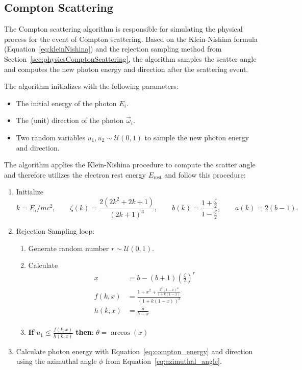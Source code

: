 \subsection{Compton Scattering}

The Compton scattering algorithm is responsible for simulating the physical process for the event of Compton scattering. Based on the Klein-Nishina formula (Equation~\ref{eq:kleinNishina}) and the rejection sampling method from Section~\ref{sec:physicsComptonScattering}, the algorithm samples the scatter angle and computes the new photon energy and direction after the scattering event.

The algorithm initializes with the following parameters:

\begin{itemize}
    \item The initial energy of the photon $E_i$.
    \item The (unit) direction of the photon $\vec{\omega}_i$.
    \item Two random variables $u_1, u_2 \sim \mathcal{U}(0, 1)$ to sample the
    new photon energy and direction.
\end{itemize}

The algorithm applies the Klein-Nishina procedure to compute the scatter angle
and therefore utilizes the electron rest energy $E_\text{rest}$ and follow this
procedure:

\begin{enumerate}[label=\arabic*.]
    \item Initialize 
    \begin{equation*}
        k = E_i/ mc^2, \qquad \zeta(k) = \frac{2(2k^2+2k+1)}{(2k + 1)^3}, \qquad b(k) = \frac{1+\frac{\zeta}{2}}{1-\frac{\zeta}{2}}, \qquad a(k) = 2(b-1).
    \end{equation*}
    \item Rejection Sampling loop:
        \begin{enumerate}[label*=\arabic*.]
            \item Generate random number $r\sim\mathcal{U}(0,1)$.
            \item Calculate 
            \begin{align*}
                x&=b-(b+1)\left(\frac{\zeta}{2}\right)^r \\
                f(k,x) &= \frac{1+x^2+\frac{k^2(1-x)^2}{1+k(1-x)}}{(1+k(1-x))^2} \\
                h(k,x) &= \frac{a}{b-x} \\
            \end{align*}
            \item \textbf{If} $u_1 \leq \frac{f(k,x)}{h(k,x)}$ \textbf{then}: $\theta = \arccos(x)$
        \end{enumerate}
    \item Calculate photon energy with Equation~\ref{eq:compton_energy} and direction using the azimuthal angle $\phi$ from Equation~\ref{eq:azimuthal_angle}.
\end{enumerate}


